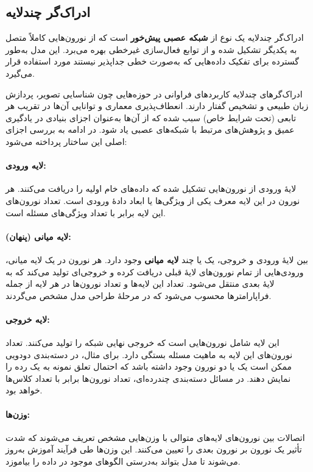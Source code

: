 \subsection*{ادراک‌گر چندلایه}

ادراک‌گر چندلایه یک نوع از \textbf{شبکه عصبی پیش‌خور} است که از نورون‌هایی کاملاً متصل به یکدیگر تشکیل شده و از توابع فعال‌سازی غیرخطی بهره می‌برد. این مدل به‌طور گسترده برای تفکیک داده‌هایی که به‌صورت خطی جداپذیر نیستند مورد استفاده قرار می‌گیرد.

ادراک‌گرهای چندلایه کاربردهای فراوانی در حوزه‌هایی چون شناسایی تصویر، پردازش زبان طبیعی و تشخیص گفتار دارند. انعطاف‌پذیری معماری و توانایی آن‌ها در تقریب هر تابعی (تحت شرایط خاص) سبب شده که از آن‌ها به‌عنوان اجزای بنیادی در یادگیری عمیق و پژوهش‌های مرتبط با شبکه‌های عصبی یاد شود. در ادامه به بررسی اجزای اصلی این ساختار پرداخته می‌شود:

\paragraph{لایه ورودی:}
لایهٔ ورودی از نورون‌هایی تشکیل شده که داده‌های خام اولیه را دریافت می‌کنند. هر نورون در این لایه معرف یکی از ویژگی‌ها یا ابعاد دادهٔ ورودی است. تعداد نورون‌های این لایه برابر با تعداد ویژگی‌های مسئله است.

\paragraph{لایه میانی (پنهان):}
بین لایهٔ ورودی و خروجی، یک یا چند \textbf{لایه میانی} وجود دارد. هر نورون در یک لایه میانی، ورودی‌هایی از تمام نورون‌های لایهٔ قبلی دریافت کرده و خروجی‌ای تولید می‌کند که به لایهٔ بعدی منتقل می‌شود. تعداد این لایه‌ها و تعداد نورون‌ها در هر لایه از جمله فراپارامترها محسوب می‌شود که در مرحلهٔ طراحی مدل مشخص می‌گردند.

\paragraph{لایه خروجی:}
این لایه شامل نورون‌هایی است که خروجی نهایی شبکه را تولید می‌کنند. تعداد نورون‌های این لایه به ماهیت مسئله بستگی دارد. برای مثال، در دسته‌بندی دودویی ممکن است یک یا دو نورون وجود داشته باشد که احتمال تعلق نمونه به یک رده را نمایش دهند. در مسائل دسته‌بندی چندرده‌ای، تعداد نورون‌ها برابر با تعداد کلاس‌ها خواهد بود.

\paragraph{وزن‌ها:}
اتصالات بین نورون‌های لایه‌های متوالی با وزن‌هایی مشخص تعریف می‌شوند که شدت تأثیر یک نورون بر نورون بعدی را تعیین می‌کنند. این وزن‌ها طی فرآیند آموزش به‌روز می‌شوند تا مدل بتواند به‌درستی الگوهای موجود در داده را بیاموزد.

